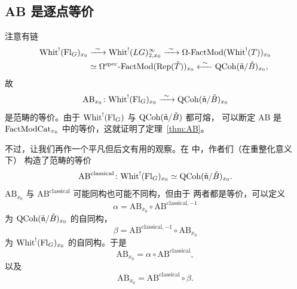 \subsection{AB 是逐点等价}
\label{sec:ab-pointwise}

注意有链
\begin{align}
\mathrm{Whit}^{!}(\mathrm{Fl}_G)_{x_0}
&\xrightarrow{\ \sim\ }\mathrm{Whit}^{!}(LG)^{\infty}_{2,x_0}
\xrightarrow{\ \sim\ }\Omega\text{-}\mathrm{FactMod}(\mathrm{Whit}^{!}(T))_{x_0}
\label{eq:3.2.5}\\
&\simeq \Omega^{\mathrm{spec}}\text{-}\mathrm{FactMod}(\mathrm{Rep}(\check T))_{x_0}
\xleftarrow{\ \sim\ }\mathrm{QCoh}(\check{\mathfrak{n}}/\check B)_{x_0},
\label{eq:3.2.6}
\end{align}
故
\[
\mathrm{AB}_{x_0}\colon \mathrm{Whit}^{!}(\mathrm{Fl}_G)_{x_0}
\xrightarrow{\ \sim\ }\mathrm{QCoh}(\check{\mathfrak{n}}/\check B)_{x_0}
\]
是范畴的等价。由于 $\mathrm{Whit}^{!}(\mathrm{Fl}_G)$ 与 $\mathrm{QCoh}(\check{\mathfrak{n}}/\check B)$ 都可熔，
可以断定 AB 是 $\mathrm{FactModCat}_{x_0}$ 中的等价，这就证明了定理~\ref{thm:AB}。

不过，让我们再作一个平凡但后文有用的观察。在 \cite{AB09} 中，作者们（在重整化意义下）
构造了范畴的等价
\[
\mathrm{AB}^{\mathrm{classical}}\colon
\mathrm{Whit}^{!}(\mathrm{Fl}_G)_{x_0}\simeq \mathrm{QCoh}(\check{\mathfrak{n}}/\check B)_{x_0}.
\]
$\mathrm{AB}_{x_0}$ 与 $\mathrm{AB}^{\mathrm{classical}}$ 可能同构也可能不同构，但由于
两者都是等价，可以定义
\[
\alpha=\mathrm{AB}_{x_0}\circ \mathrm{AB}^{\mathrm{classical},-1}
\]
为 $\mathrm{QCoh}(\check{\mathfrak{n}}/\check B)_{x_0}$ 的自同构，
\[
\beta=\mathrm{AB}^{\mathrm{classical},-1}\circ \mathrm{AB}_{x_0}
\]
为 $\mathrm{Whit}^{!}(\mathrm{Fl}_G)_{x_0}$ 的自同构。于是
\[
\mathrm{AB}_{x_0}=\alpha\circ \mathrm{AB}^{\mathrm{classical}},
\]
以及
\[
\mathrm{AB}_{x_0}=\mathrm{AB}^{\mathrm{classical}}\circ \beta .
\]
